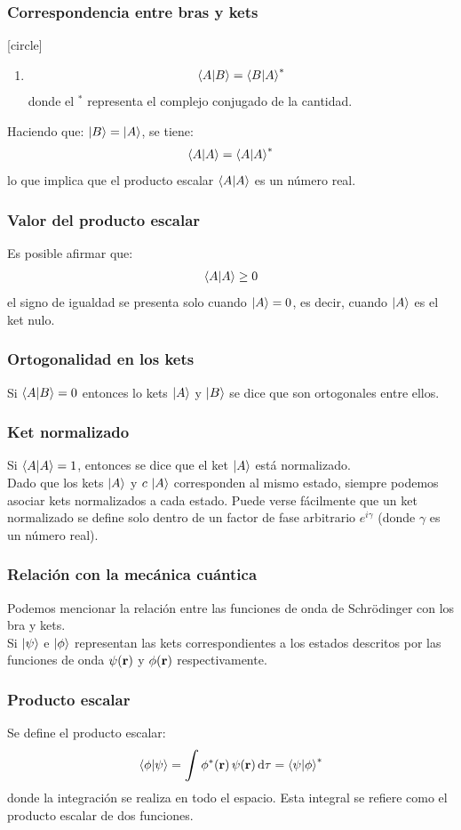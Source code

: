 \documentclass[12pt]{beamer}
\begin{document}
\begin{frame}
\frametitle{Correspondencia entre bras y kets}
[circle]
\begin{enumerate}[<+->]    
\conti
\item \begin{align*}
\braket{A}{B} = \braket{B}{A}^{*}
\end{align*}
donde el ${}^{*}$ representa el complejo conjugado de la cantidad. 
\end{enumerate}
\pause
Haciendo que: $\ket{B} = \ket{A}$, se tiene:
\pause
\begin{align*}
\braket{A}{A} = \braket{A}{A}^{*}
\end{align*}
lo que implica que el producto escalar $\braket{A}{A}$ es un número real.
\end{frame}
\begin{frame}
\frametitle{Valor del producto escalar}
Es posible afirmar que:
\pause
\begin{align*}
\braket{A}{A} \geq 0
\end{align*}
\pause
el signo de igualdad se presenta solo cuando $\ket{A} = 0$, es decir, cuando $\ket{A}$ es el ket nulo.
\end{frame}
\begin{frame}
\frametitle{Ortogonalidad en los kets}
Si $\braket{A}{B} = 0$ entonces lo kets $\ket{A}$ y $\ket{B}$ se dice que son ortogonales entre ellos.
\end{frame}
\begin{frame}
\frametitle{Ket normalizado}
Si $\braket{A}{A} = 1$, entonces se dice que el ket $\ket{A}$ está normalizado.
\\
\bigskip
\pause
Dado que los kets $\ket{A}$ y $c \, \ket{A}$ corresponden al mismo estado, siempre podemos asociar kets normalizados a cada estado. \pause Puede verse fácilmente que un ket normalizado se define solo dentro de un factor de fase arbitrario $e^{i \gamma}$ (donde $\gamma$ es un número real).
\end{frame}
\begin{frame}
\frametitle{Relación con la mecánica cuántica}
Podemos mencionar la relación entre las funciones de onda de Schrödinger con los bra y kets.
\\
\bigskip
\pause
Si $\ket{\psi}$ e $\ket{\phi}$ representan las kets correspondientes a los estados descritos por las funciones de onda $\psi(\vb{r})$ y $\phi(\vb{r})$ respectivamente.
\end{frame}
\begin{frame}
\frametitle{Producto escalar}
Se define el producto escalar:
\pause
\begin{align*}
\braket{\phi}{\psi} = \scaleint{6ex} \, \phi^{*} (\vb{r}) \, \psi (\vb{r}) \dd{\tau} = \braket{\psi}{\phi}^{*}
\end{align*}
donde la integración se realiza en todo el espacio. Esta integral se refiere como el producto escalar de dos funciones.
\end{frame}
\end{document}
